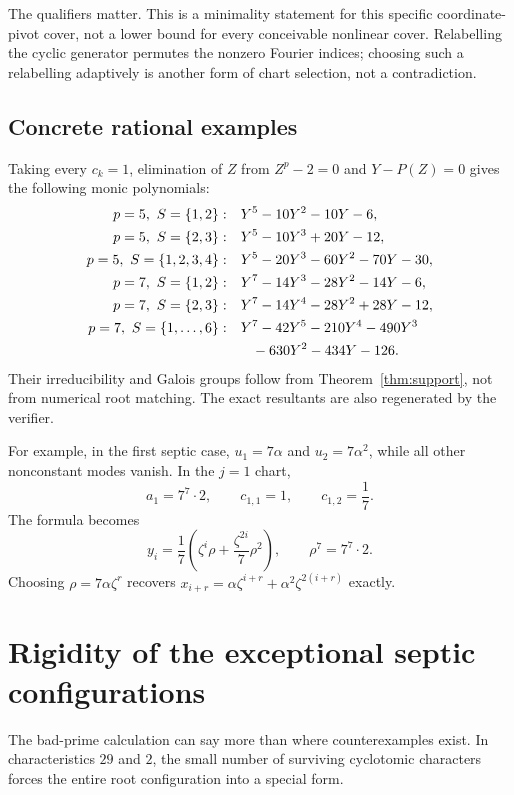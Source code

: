 \documentclass[11pt,a4paper]{article}
\theoremstyle{definition}
\theoremstyle{remark}
\begin{document}
The qualifiers matter. This is a minimality statement for this specific
coordinate-pivot cover, not a lower bound for every conceivable nonlinear
cover. Relabelling the cyclic generator permutes the nonzero Fourier
indices; choosing such a relabelling adaptively is another form of chart
selection, not a contradiction.

\subsection{Concrete rational examples}

Taking every $c_k=1$, elimination of $Z$ from
$Z^p-2=0$ and $Y-P(Z)=0$ gives the following monic polynomials:
\begin{align*}
 p=5,\ S=\{1,2\}:&\quad Y^5-10Y^2-10Y-6,\\
 p=5,\ S=\{2,3\}:&\quad Y^5-10Y^3+20Y-12,\\
 p=5,\ S=\{1,2,3,4\}:&\quad Y^5-20Y^3-60Y^2-70Y-30,\\
 p=7,\ S=\{1,2\}:&\quad Y^7-14Y^3-28Y^2-14Y-6,\\
 p=7,\ S=\{2,3\}:&\quad Y^7-14Y^4-28Y^2+28Y-12,\\
 p=7,\ S=\{1,\ldots,6\}:&\quad
 Y^7-42Y^5-210Y^4-490Y^3\\
 &\hspace{1.8em}{}-630Y^2-434Y-126.
\end{align*}
Their irreducibility and Galois groups follow from
Theorem~\ref{thm:support}, not from numerical root matching. The exact
resultants are also regenerated by the verifier.

For example, in the first septic case, $u_1=7\alpha$ and
$u_2=7\alpha^2$, while all other nonconstant modes vanish. In the $j=1$
chart,
\[
 a_1=7^7\cdot2,\qquad c_{1,1}=1,\qquad c_{1,2}=\frac17.
\]
The formula becomes
\[
 y_i=\frac17\left(\zeta^i\rho+
                       \frac{\zeta^{2i}}7\rho^2\right),
 \qquad \rho^7=7^7\cdot2.
\]
Choosing $\rho=7\alpha\zeta^r$ recovers
$x_{i+r}=\alpha\zeta^{i+r}+\alpha^2\zeta^{2(i+r)}$ exactly.

\section{Rigidity of the exceptional septic configurations}
\label{sec:rigidity}

The bad-prime calculation can say more than where counterexamples exist.
In characteristics $29$ and $2$, the small number of surviving cyclotomic
characters forces the entire root configuration into a special form.
\end{document}
